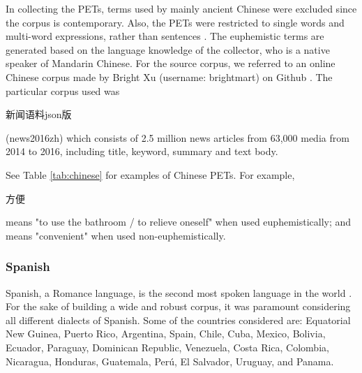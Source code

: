 \documentclass[11pt]{article}
\begin{document}
In collecting the PETs, terms used by mainly ancient Chinese were excluded since the corpus is contemporary. Also, the PETs were restricted to single words and multi-word expressions, rather than sentences \cite{Zhang_2019}. The euphemistic terms are generated based on the language knowledge of the collector, who is a native speaker of Mandarin Chinese. For the source corpus, we referred to an online Chinese corpus made by Bright Xu (username: brightmart) on Github \cite{NLP_Chinese_Corpus}. The particular corpus used was \begin{CJK}{UTF8}{gbsn} 新闻语料json版 \end{CJK}(news2016zh) which consists of 2.5 million news articles from 63,000 media from 2014 to 2016, including title, keyword, summary and text body.

See Table \ref{tab:chinese} for examples of Chinese PETs. For example, \begin{CJK}{UTF8}{gbsn} 方便\end{CJK} means "to use the bathroom / to relieve oneself" when used euphemistically; and means "convenient" when used non-euphemistically. 

\subsubsection {Spanish}

Spanish, a Romance language, is the second most spoken language in the world \cite{ethnologue}. For the sake of building a wide and robust corpus, it was paramount considering all different dialects of Spanish. Some of the countries considered are: Equatorial New Guinea, Puerto Rico, Argentina, Spain, Chile, Cuba, Mexico, Bolivia, Ecuador, Paraguay, Dominican Republic, Venezuela, Costa Rica, Colombia, Nicaragua, Honduras, Guatemala, Per\'{u}, El Salvador, Uruguay, and Panama. 
\end{document}

